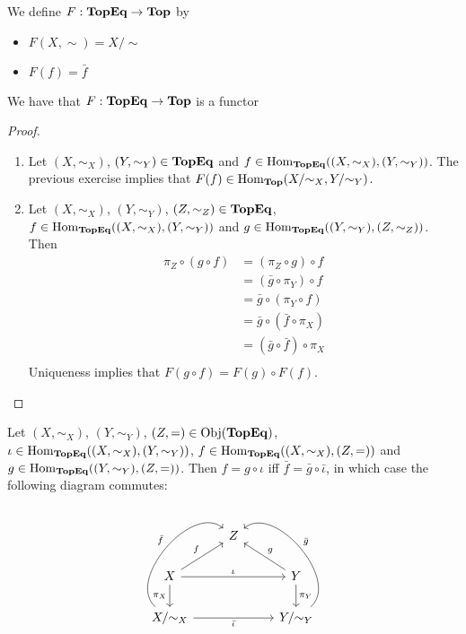 \documentclass{book}
\begin{document}
	\begin{defn} \ld{}
		We define $F: \operatorname*{\text{\textbf{TopEq}}} \rightarrow \operatorname*{\text{\textbf{Top}}}$ by
		\begin{itemize}
			\item $F(X, \sim) = X/\sim$
			\item $F(f) = \bar{f}$
		\end{itemize}
	\end{defn}

	\begin{ex}
		We have that $F: \operatorname*{\text{\textbf{TopEq}}} \rightarrow \operatorname*{\text{\textbf{Top}}}$ is a functor
	\end{ex}

	\begin{proof}\
		\begin{enumerate}
			\item Let $(X, \sim_X)$, $(Y, \sim_Y) \in \operatorname*{\text{\textbf{TopEq}}}$ and $f \in \operatorname{Hom}_{\operatorname*{\text{\textbf{TopEq}}}}((X, \sim_X), (Y, \sim_Y))$. The previous exercise implies that $F(f) \in \operatorname{Hom}_{\operatorname*{\text{\textbf{Top}}}}(X/{\sim_X}, Y/ {\sim_Y})$. 
			\item  Let $(X, \sim_X)$, $(Y, \sim_Y)$, $(Z, \sim_Z) \in \operatorname*{\text{\textbf{TopEq}}}$,  $f \in \operatorname{Hom}_{\operatorname*{\text{\textbf{TopEq}}}}((X, \sim_X), (Y, \sim_Y))$ and $g \in \operatorname{Hom}_{\operatorname*{\text{\textbf{TopEq}}}}((Y, \sim_Y), (Z, \sim_Z))$. Then 
			\begin{align*}
				\pi_Z \circ (g \circ f)
				& = (\pi_Z \circ g) \circ f \\
				& = (\bar{g} \circ \pi_Y) \circ f \\
				& = \bar{g} \circ (\pi_Y \circ f) \\
				& = \bar{g} \circ (\bar{f} \circ \pi_X) \\
				& = (\bar{g} \circ \bar{f}) \circ \pi_X \\
			\end{align*}
			Uniqueness implies that $F(g \circ f) = F(g) \circ F(f)$. 
		\end{enumerate}
	\end{proof}

	\begin{ex}
		Let $(X, \sim_X)$, $(Y, \sim_Y)$, $(Z, =)  \in \operatorname{Obj}(\operatorname*{\text{\textbf{TopEq}}})$, $\iota \in \operatorname{Hom}_{\operatorname*{\text{\textbf{TopEq}}}}((X, \sim_X), (Y, \sim_Y))$,  $ f \in \operatorname{Hom}_{\operatorname*{\text{\textbf{TopEq}}}}((X, \sim_X), (Z, =))$ and  $ g \in \operatorname{Hom}_{\operatorname*{\text{\textbf{TopEq}}}}((Y, \sim_Y), (Z, =))$. 
		Then $f = g \circ \iota $ iff $\bar{f} = \bar{g} \circ \bar{\iota}$, in which case the following diagram commutes: 
		\[ 
		\begin{tikzcd}
			& Z & \\
			X  \arrow[rr, "\iota"]  \arrow[d, "\pi_X"'] \arrow[ur, "f"] & & Y   \arrow[d, "\pi_Y"] \arrow[ul, "g"']\\
			X/ {\sim_X} \arrow[bend left=90]{uur}{\bar{f}} \arrow[rr, "\bar{\iota}"'] & &  Y / {\sim_Y} \arrow[bend right=90, swap]{uul}{\bar{g}} \\
		\end{tikzcd}
		\]
	\end{ex}
\end{document}
